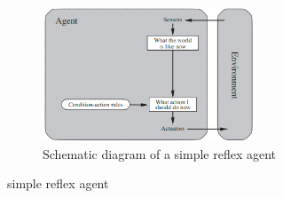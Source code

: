 \begin{table}[H]
    \begin{minipage}{0.4\linewidth}
        \begin{figure}[H]
            \centering
            \includegraphics[width=\linewidth, height=4cm, keepaspectratio]{Pictures/ai-ml/agent--simple-reflex.png}
            \caption{Schematic diagram of a simple reflex agent}
        \end{figure}
    \end{minipage}
    \hfill
    \begin{minipage}{0.58\linewidth}
        \begin{algorithm}[H]
            \caption{simple reflex agent \cite{aci-1}}

        \end{algorithm}
    \end{minipage}
\end{table}

\vspace{0.3cm}


